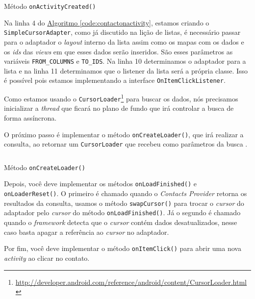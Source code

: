 \documentclass[a4paper,12pt,brazil,oneside]{book}
\begin{document}
\begin{singlespace}
		\begin{listing}[H]
		\inputminted[linenos=true,fontsize=\small,frame=lines, framesep=2mm, tabsize=2,numbersep=5pt]{java}{src/api/contacts/onactivity.java}
		\caption{Método \texttt{onActivityCreated()}}
		\label{code:contactonactivity}
		\end{listing} 	

	Na linha 4 do \hyperref[code:contactonactivity]{Algoritmo \ref*{code:contactonactivity}}, estamos criando o \texttt{SimpleCursorAdapter}, como já discutido na lição de listas, é necessário passar para o adaptador o \emph{layout} interno da lista assim como os mapas com os dados e os \emph{ids} das \emph{views} em que esses dados serão inseridos. São esses parâmetros as variáveis \texttt{FROM\_COLUMNS} e \texttt{TO\_IDS}. Na linha 10 determinamos o adaptador para a lista e na linha 11 determinamos que o listener da lista será a própria classe. Isso é possível pois estamos implementando a interface \texttt{OnItemClickListener}.

	Como estamos usando o \texttt{CursorLoader}\footnote{\href{http://developer.android.com/reference/android/content/CursorLoader.html}{http://developer.android.com/reference/android/content/CursorLoader.html}} para buscar os dados, nós precisamos inicializar a \emph{thread} que ficará no plano de fundo que irá controlar a busca de forma assíncrona. 

	O próximo passo é implementar o método \texttt{onCreateLoader()}, que irá realizar a consulta, ao retornar um \texttt{CursorLoader} que recebeu como parâmetros da busca .

		\begin{listing}[H]
		\inputminted[linenos=true,fontsize=\small,frame=lines, framesep=2mm, tabsize=2,numbersep=5pt]{java}{src/api/contacts/oncreateloader.java}
		\caption{Método \texttt{onCreateLoader()}}
		\label{code:contactoncreateloader}
		\end{listing} 	

	Depois, você deve implementar os métodos \texttt{onLoadFinished()} e \texttt{onLoaderReset()}. O primeiro é chamado quando o \emph{Contacts Provider} retorna os resultados da consulta, usamos o método \texttt{swapCursor()} para trocar o \emph{cursor} do adaptador pelo \emph{cursor} do método \texttt{onLoadFinished()}. Já o segundo é chamado quando o \emph{framework} detecta que o \emph{cursor} contém dados desatualizados, nesse caso basta apagar a referência ao \emph{cursor} no adaptador.
	 
	Por fim, você deve implementar o método \texttt{onItemClick()} para abrir uma nova \emph{activity} ao clicar no contato.


\end{singlespace}
\end{document}
